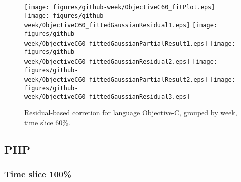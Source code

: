 \begin{figure}[hb]
\centering
{}
{\texttt{[image: figures/github-week/ObjectiveC60\_fitPlot.eps]}}
{\texttt{[image: figures/github-week/ObjectiveC60\_fittedGaussianResidual1.eps]}}
{\texttt{[image: figures/github-week/ObjectiveC60\_fittedGaussianPartialResult1.eps]}}
{\texttt{[image: figures/github-week/ObjectiveC60\_fittedGaussianResidual2.eps]}}
{\texttt{[image: figures/github-week/ObjectiveC60\_fittedGaussianPartialResult2.eps]}}
{\texttt{[image: figures/github-week/ObjectiveC60\_fittedGaussianResidual3.eps]}}
\caption{Residual-based corretion for language Objective-C, grouped by week, time slice 60\%.}
\end{figure}


\clearpage 
\newpage 


\subsection{PHP}

\FloatBarrier

\subsubsection{Time slice 100\%}

